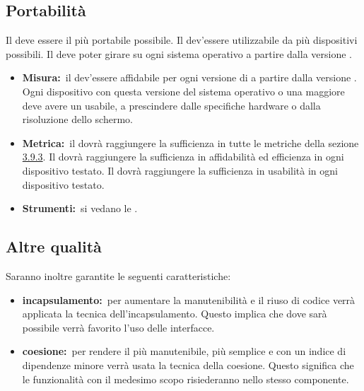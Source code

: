 \subsection{Portabilità}
Il  deve essere il più portabile possibile. Il  dev'essere utilizzabile da più dispositivi possibili. Il  deve poter girare su ogni sistema operativo  a partire dalla versione .
\begin{itemize}
\item \textbf{Misura:}\ il  dev'essere affidabile per ogni versione di  a partire dalla versione . Ogni dispositivo con questa versione del sistema operativo o una maggiore deve avere un  usabile, a prescindere dalle specifiche hardware o dalla risoluzione dello schermo.
\item \textbf{Metrica:}\ il  dovrà raggiungere la sufficienza in tutte le metriche della sezione \hyperref[sec:Misure]{3.9.3}. Il  dovrà raggiungere la sufficienza in affidabilità ed efficienza in ogni dispositivo testato. Il  dovrà raggiungere la sufficienza in usabilità in ogni dispositivo testato.
\item \textbf{Strumenti:}\ si vedano le \NPdoc.
\end{itemize}

\subsection{Altre qualità}
Saranno inoltre garantite le seguenti caratteristiche:
\begin{itemize}
\item \textbf{incapsulamento:}\ per aumentare la manutenibilità e il riuso di codice verrà applicata la tecnica dell'incapsulamento. Questo implica che dove sarà possibile verrà favorito l'uso delle interfacce.
\item \textbf{coesione:}\ per rendere il  più manutenibile, più semplice e con un indice di dipendenze minore verrà usata la tecnica della coesione. Questo significa che le funzionalità con il medesimo scopo risiederanno nello stesso componente.
\end{itemize}